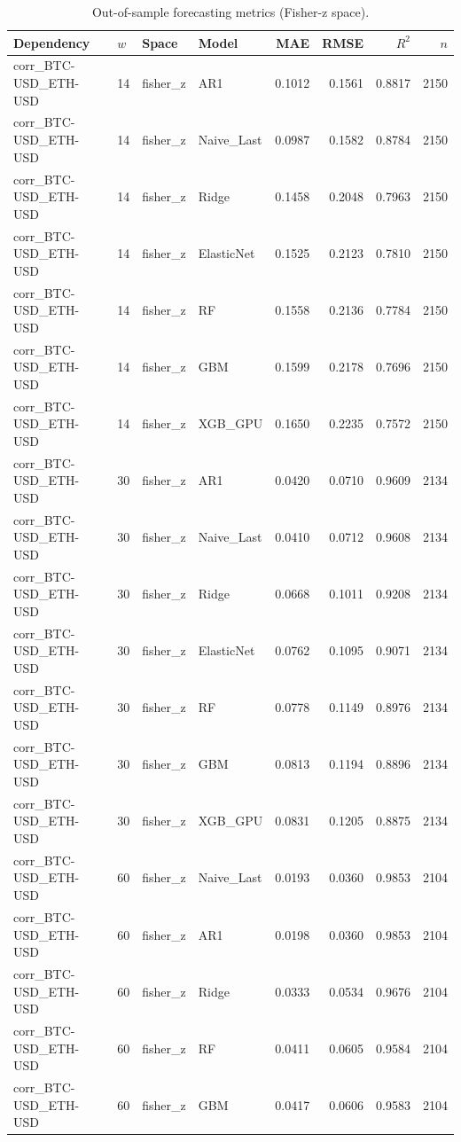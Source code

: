 \begin{table}[H]
\centering
\small
\caption{Out-of-sample forecasting metrics (Fisher-z space).}
\label{tab:metrics}
\begin{tabular}{llllrrrr}
\toprule
Dependency & $w$ & Space & Model & MAE & RMSE & $R^2$ & $n$ \\
\midrule
corr_BTC-USD_ETH-USD & 14 & fisher_z & AR1 & 0.1012 & 0.1561 & 0.8817 & 2150 \\
corr_BTC-USD_ETH-USD & 14 & fisher_z & Naive_Last & 0.0987 & 0.1582 & 0.8784 & 2150 \\
corr_BTC-USD_ETH-USD & 14 & fisher_z & Ridge & 0.1458 & 0.2048 & 0.7963 & 2150 \\
corr_BTC-USD_ETH-USD & 14 & fisher_z & ElasticNet & 0.1525 & 0.2123 & 0.7810 & 2150 \\
corr_BTC-USD_ETH-USD & 14 & fisher_z & RF & 0.1558 & 0.2136 & 0.7784 & 2150 \\
corr_BTC-USD_ETH-USD & 14 & fisher_z & GBM & 0.1599 & 0.2178 & 0.7696 & 2150 \\
corr_BTC-USD_ETH-USD & 14 & fisher_z & XGB_GPU & 0.1650 & 0.2235 & 0.7572 & 2150 \\
corr_BTC-USD_ETH-USD & 30 & fisher_z & AR1 & 0.0420 & 0.0710 & 0.9609 & 2134 \\
corr_BTC-USD_ETH-USD & 30 & fisher_z & Naive_Last & 0.0410 & 0.0712 & 0.9608 & 2134 \\
corr_BTC-USD_ETH-USD & 30 & fisher_z & Ridge & 0.0668 & 0.1011 & 0.9208 & 2134 \\
corr_BTC-USD_ETH-USD & 30 & fisher_z & ElasticNet & 0.0762 & 0.1095 & 0.9071 & 2134 \\
corr_BTC-USD_ETH-USD & 30 & fisher_z & RF & 0.0778 & 0.1149 & 0.8976 & 2134 \\
corr_BTC-USD_ETH-USD & 30 & fisher_z & GBM & 0.0813 & 0.1194 & 0.8896 & 2134 \\
corr_BTC-USD_ETH-USD & 30 & fisher_z & XGB_GPU & 0.0831 & 0.1205 & 0.8875 & 2134 \\
corr_BTC-USD_ETH-USD & 60 & fisher_z & Naive_Last & 0.0193 & 0.0360 & 0.9853 & 2104 \\
corr_BTC-USD_ETH-USD & 60 & fisher_z & AR1 & 0.0198 & 0.0360 & 0.9853 & 2104 \\
corr_BTC-USD_ETH-USD & 60 & fisher_z & Ridge & 0.0333 & 0.0534 & 0.9676 & 2104 \\
corr_BTC-USD_ETH-USD & 60 & fisher_z & RF & 0.0411 & 0.0605 & 0.9584 & 2104 \\
corr_BTC-USD_ETH-USD & 60 & fisher_z & GBM & 0.0417 & 0.0606 & 0.9583 & 2104 \\

\end{tabular}
\end{table}
